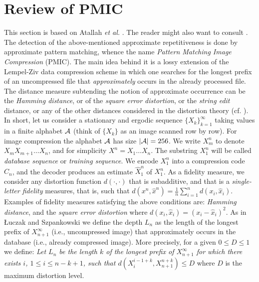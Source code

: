 \documentclass[11pt,a4paper]{article}
\newcommand{\A}{{\cal A}}
\newcommand{\X}{\{X_k\}}
\newcommand{\HX}{\hat{X}}
\newcommand{\tx}{\hat{x}}
\begin{document}
\section{Review of PMIC}

This section is based on Atallah {\it et al.} \cite{ags}.  The reader might
also want to consult \cite{lus1,lus2,sg,yk}.\\

The detection of the above-mentioned approximate repetitiveness is done by
approximate pattern matching, whence the name {\it Pattern Matching Image
  Compression} (PMIC).  The main idea behind it is a lossy extension of the
Lempel-Ziv data compression scheme in which one searches for the longest
prefix of an uncompressed file that {\it approximately} occurs in the
already processed file.  The distance measure subtending the notion of
approximate occurrence can be the {\it Hamming distance}, or of the {\it
  square error distortion}, or the {\em string edit} distance, or any of
the other distances considered in the distortion theory (cf.
\cite{berger}).\\

In short, let us consider a stationary and ergodic sequence
$\X_{k=1}^\infty$ taking values in a finite alphabet $\A$ (think of $\X$ as
an image scanned row by row). For image compression the alphabet $\A$ has
size $|\A|=256$.  We write $X_m^n$ to denote $X_mX_{m+1}\ldots X_n$, and
for simplicity $X^n = X_1 \ldots X_n$. The substring $X_1^n$ will be called
{\it database sequence} or {\it training sequence}.  We encode $X_1^n$ into
a compression code $C_n$, and the decoder produces an estimate $\HX_1^n$ of
$X_1^n$.  As a fidelity measure, we consider any distortion function
$d(\cdot, \cdot)$ that is subadditive, and that is a {\it single-letter
  fidelity} measures, that is, such that $ d(x^n,\tx^n)=\frac 1n
\sum_{i=1}^n d(x_i,\tx_i)$. Examples of fidelity measures satisfying the
above conditions are: {\it Hamming distance}, and the {\it square error
  distortion} where $d( x_i , \tx_i ) = (x_i -\tx_i)^2$.  As in \L uczak
and Szpankowski \cite{lus1,lus2} we define the depth $L_n$ as the length of
the longest prefix of $X_{n+1}^\infty$ (i.e., uncompressed image) that
approximately occurs in the database (i.e., already compressed image).
More precisely, for a given $0\leq D\leq 1$ we define: {\it Let $L_n$ be
  the length $k$ of the longest prefix of $X_{n+1}^\infty$ for which there
  exists $i$, $1\leq i\leq n-k+1$, such that
  $d(X_i^{i-1+k},X_{n+1}^{n+k})\leq D$} where $D$ is the maximum distortion
level.\\
\end{document}
